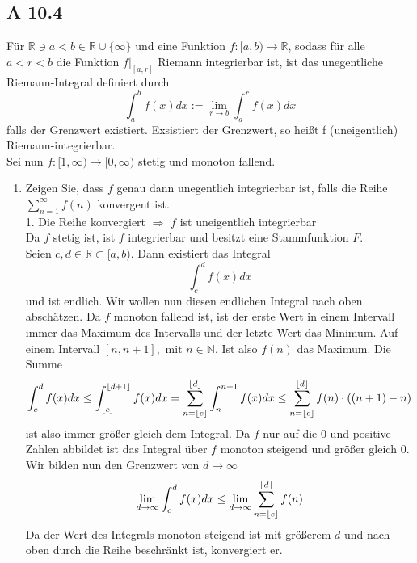 \documentclass{article}
\DeclarePairedDelimiter\floor{\lfloor}{\rfloor}
\begin{document}
\begin{enumerate}[ label = (\alph*) ]
        \section*{A 10.4}
        Für \(\mathbb{R} \ni a < b \in \mathbb{R} \cup \{\infty\}\) und eine Funktion \(f: [a,b) \to \mathbb{R}\), sodass für alle \(a < r < b\) die Funktion \(f|_{[a,r]}\) Riemann integrierbar ist,
        ist das unegentliche Riemann-Integral definiert durch
        \[ \int_a^b f(x) dx := \lim_{r \to b} \int_a^r f(x) dx \]
        falls der Grenzwert existiert. Exsistiert der Grenzwert, so heißt f (uneigentlich) Riemann-integrierbar. \\
        Sei nun \(f: [1, \infty) \to [0, \infty) \) stetig und monoton fallend.
        \begin{enumerate}[ label = (\alph*)]
            \item Zeigen Sie, dass \(f\) genau dann unegentlich integrierbar ist, falls die Reihe
            \( \sum_{n=1}^\infty f(n)\)
            konvergent ist. \\

            1. Die Reihe konvergiert \( \Rightarrow \) \(f\) ist uneigentlich integrierbar \\
            Da \(f\) stetig ist, ist \(f\) integrierbar und besitzt eine Stammfunktion \(F\). \\
            Seien \(c, d \in \mathbb{R} \subset [a, b) \). Dann existiert das Integral
            \[ \int_c^d f(x) dx\]
            und ist endlich.
            Wir wollen nun diesen endlichen Integral nach oben abschätzen. Da \(f\) monoton fallend ist, ist der erste Wert in einem Intervall immer das Maximum des Intervalls
            und der letzte Wert das Minimum. Auf einem Intervall \([n, n+1], \text{ mit } n \in \mathbb{N} \). Ist also \(f(n)\) das Maximum.
            Die Summe 
            \[ \int_c^d f(x) dx \leq \int_{\floor{c}}^{\floor{d+1}} f(x) dx  = \sum_{n = \floor{c}}^{\floor{d}} \int_n^{n+1} f(x) dx \leq \sum_{n = \floor{c}}^{\floor{d}} f(n) \cdot ((n+1)-n) \]
            ist also immer größer gleich dem Integral. 
            Da \(f\) nur auf die 0 und positive Zahlen abbildet ist das Integral über \(f\) monoton steigend und größer gleich 0.
            Wir bilden nun den Grenzwert von \(d \to \infty \)
            \[ \lim_{d \to \infty} \int_c^d f(x) dx \leq \lim_{d \to \infty} \sum_{n = \floor{c}}^{\floor{d}} f(n) \]
            Da der Wert des Integrals monoton steigend ist mit größerem \(d\) und nach oben durch die Reihe beschränkt ist, konvergiert er. \\


\end{enumerate}
\end{enumerate}
\end{document}
